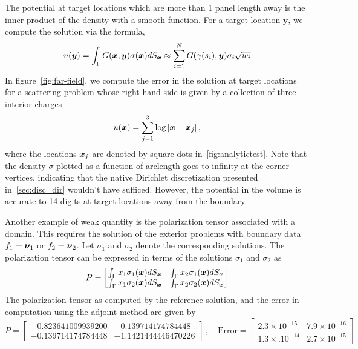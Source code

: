 The potential at target locations which are more than 1 panel length away is the inner product of the 
density with a smooth function. For a target location $\boldsymbol{y}$, we compute the solution via the formula,
\begin{equation}
u(\boldsymbol{y}) = \int_{\Gamma} G(\boldsymbol{x},\boldsymbol{y}) \sigma(\boldsymbol{x}) dS_{\boldsymbol{x}} \approx \sum_{i=1}^{N}  G(\gamma(s_{i}),\boldsymbol{y}) \sigma_{i} \sqrt{w_{i}}
\end{equation}
In figure~\cref{fig:far-field}, we compute the error in the solution at target
locations for a scattering problem whose right hand side is given by a collection of three interior charges
\begin{equation}
u(\boldsymbol{x}) = \sum_{j=1}^{3} \log |\boldsymbol{x} - \boldsymbol{x}_{j}| \, ,  
\end{equation}
where the locations $\boldsymbol{x}_{j}$ are denoted by square dots in~\cref{fig:analytictest}. Note that the density $\sigma$ plotted
as a function of arclength goes to infinity at the corner vertices, indicating that the native Dirichlet discretization 
presented in~\cref{sec:disc_dir} wouldn't have sufficed. However, the potential in the volume is accurate to 14 digits at
target locations away from the boundary. 

Another example of weak quantity is the polarization tensor associated with a domain. This requires the solution of the
exterior problems with boundary data $f_{1} = \boldsymbol{\nu}_{1}$ or $f_{2} = \boldsymbol{\nu}_{2}$. Let $\sigma_{1}$ and $\sigma_{2}$ denote
the corresponding solutions. The polarization tensor can be expressed in terms of the solutions $\sigma_{1}$ and $\sigma_{2}$
as
\begin{equation}
P = \begin{bmatrix}
\int_{\Gamma} x_{1} \sigma_{1}(\boldsymbol{x}) dS_{\boldsymbol{x}} & \int_{\Gamma} x_{2} \sigma_{1}(\boldsymbol{x}) dS_{\boldsymbol{x}} \\
\int_{\Gamma} x_{1} \sigma_{2}(\boldsymbol{x}) dS_{\boldsymbol{x}} & \int_{\Gamma} x_{2} \sigma_{2}(\boldsymbol{x}) dS_{\boldsymbol{x}} 
\end{bmatrix}
\end{equation}
The polarization tensor as computed by the reference solution, and the error in computation using the adjoint method
are given by
\begin{equation}
P = \begin{bmatrix}
-0.823641009939200 & -0.139714174784448 \\
 -0.139714174784448 &  -1.1421444446470226
\end{bmatrix} \, , \quad \text{Error} = 
\begin{bmatrix} 
2.3 \times 10^{-15} & 7.9 \times 10^{-16} \\
1.3 \times. 10^{-14} & 2.7 \times 10^{-15}
\end{bmatrix}
\end{equation}

